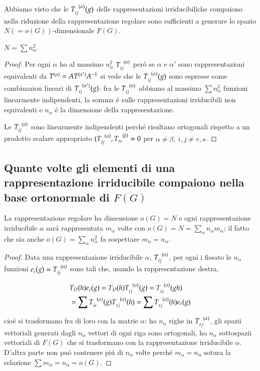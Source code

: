 \documentclass[oneside,12pt]{memoir}
\begin{document}
Abbiamo visto che le $T\indices{_i_j^{(\alpha)}}(g)$ delle rappresentazioni irriducibiliche compaiono nella riduzione della rappresentazione regolare sono sufficienti a generare lo spazio $N(=o(G))$-dimensionale $F(G)$.

$N=\sum n^2_{\alpha}$.

\begin{proof}
Per ogni $\alpha$ ho al massimo $n_{\alpha}^2$ $T\indices{_i_j^{(\alpha)}}$ per\'o se $\alpha$ e $\alpha'$ sono rappresentazioni equivalenti da $T\indices{^{(\alpha)}}=AT\indices{^{(\alpha')}}\invers{A}$ si vede che le $T\indices{_i_j^{(\alpha)}}(g)$ sono espresse come combinazion lineari di $T\indices{_i_j^{(\alpha')}}(g)$: fra le $T\indices{_i_j^{(\alpha)}}$ abbiamo al massimo $\sum n_{\alpha}^2$ funzioni linearmente indipendenti, la somma \'e sulle rappresentazioni irriducibili non equivalenti e $n_{\alpha}$ \'e la dimensione della rappresentazione.

Le $T\indices{_i_j^{(\alpha)}}$ sono linearmente indipendenti perch\'e risultano ortogonali rispetto a un prodotto scalare appropriato $(T\indices{_i_j^{(\alpha)}},T\indices{_r_s^{(\beta)}}=0$ per $\alpha\neq\beta,\ i,j\neq r,s$.
\end{proof}


\subsection{Quante volte gli elementi di una rappresentazione irriducibile compaiono nella base ortonormale di $F(G)$}\label{ssec:quantevolteri}

La rappresentazione regolare ha dimensione $o(G)=N$ e ogni rappresentazione irriducibile $\alpha$ sar\'a rappresentata $m_{\alpha}$ volte con $o(G)=N=\sum_{\alpha}n_{\alpha}m_{\alpha}$; il fatto che sia anche $o(G)=\sum_{\alpha}n_{\alpha}^2$ fa sospettare $m_{\alpha}=n_{\alpha}$.



\begin{proof}
Data una rappresentazione irriducibile $\alpha$, $T\indices{_i_j^{(\alpha)}}$, per ogni i fissato le $n_{\alpha}$ funzioni $e_j(g)=T\indices{_i_j^{(\alpha)}}$ sono tali che, usando la rappresentazione destra,

\begin{align*}
&T_D(h)e_j(g)=T_D(h)T\indices{_i_j^{(\alpha)}}(g)=T\indices{_i_j^{(\alpha)}}(gh)\\
&=\sum T\indices{_i_r^{(\alpha)}}(g)T\indices{_r_j^{(\alpha)}}(h)=\sum T\indices{_r_j^{(\alpha)}}(h)e_r(g)
\end{align*}

cio\'e si trasformano fra di loro con la matrie $\alpha$: ho $n_{\alpha}$ righe in $T\indices{_r_j^{(\alpha)}}$, gli spazii vettoriali generati dagli $n_{\alpha}$ vettori di ogni riga sono ortogonali, ho $n_{\alpha}$ sottospazii vettoriali di $F(G)$ che si trasformano con la rappresentazione irriducibile $\alpha$. D'altra parte non pu\'o contenere pi\'u di $n_{\alpha}$ volte perch\'e $m_{\alpha}=n_{\alpha}$ sotura la relazione $\sum m_{\alpha}=n_{\alpha}=o(G)$.

\end{proof}
\end{document}
